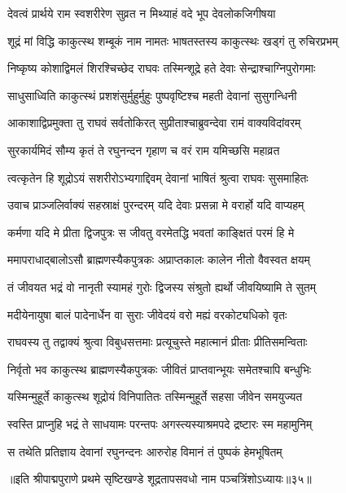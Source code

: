 \twolineshloka
{देवत्वं प्रार्थये राम स्वशरीरेण सुव्रत}
{न मिथ्याहं वदे भूप देवलोकजिगीषया}%

\twolineshloka
{शूद्रं मां विद्धि काकुत्स्थ शम्बूकं नाम नामतः}
{भाषतस्तस्य काकुत्स्थः खड्गं तु रुचिरप्रभम्}%

\twolineshloka
{निष्कृष्य कोशाद्विमलं शिरश्चिच्छेद राघवः}
{तस्मिन्शूद्रे हते देवाः सेन्द्राश्चाग्निपुरोगमाः}%

\twolineshloka
{साधुसाध्विति काकुत्स्थं प्रशशंसुर्मुहुर्मुहुः}
{पुष्पवृष्टिश्च महती देवानां सुसुगन्धिनी}%

\twolineshloka
{आकाशाद्विप्रमुक्ता तु राघवं सर्वतोकिरत्}
{सुप्रीताश्चाब्रुवन्देवा रामं वाक्यविदांवरम्}%

\twolineshloka
{सुरकार्यमिदं सौम्य कृतं ते रघुनन्दन}
{गृहाण च वरं राम यमिच्छसि महाव्रत}%

\twolineshloka
{त्वत्कृतेन हि शूद्रोऽयं सशरीरोऽभ्यगाद्दिवम्}
{देवानां भाषितं श्रुत्वा राघवः सुसमाहितः}%

\twolineshloka
{उवाच प्राञ्जलिर्वाक्यं सहस्राक्षं पुरन्दरम्}
{यदि देवाः प्रसन्ना मे वरार्हो यदि वाप्यहम्}%

\twolineshloka
{कर्मणा यदि मे प्रीता द्विजपुत्रः स जीवतु}
{वरमेतद्धि भवतां काङ्क्षितं परमं हि मे}%

\twolineshloka
{ममापराधाद्बालोऽसौ ब्राह्मणस्यैकपुत्रकः}
{अप्राप्तकालः कालेन नीतो वैवस्वत क्षयम्}%

\twolineshloka
{तं जीवयत भद्रं वो नानृती स्यामहं गुरोः}
{द्विजस्य संश्रुतो ह्यर्थो जीवयिष्यामि ते सुतम्}%

\twolineshloka
{मदीयेनायुषा बालं पादेनार्धेन वा सुराः}
{जीवेदयं वरो मह्यं वरकोट्यधिको वृतः}%

\twolineshloka
{राघवस्य तु तद्वाक्यं श्रुत्वा विबुधसत्तमाः}
{प्रत्यूचुस्ते महात्मानं प्रीताः प्रीतिसमन्विताः}%

\twolineshloka
{निर्वृतो भव काकुत्स्थ ब्राह्मणस्यैकपुत्रकः}
{जीवितं प्राप्तवान्भूयः समेतश्चापि बन्धुभिः}%

\twolineshloka
{यस्मिन्मुहूर्ते काकुत्स्थ शूद्रोयं विनिपातितः}
{तस्मिन्मुहूर्ते सहसा जीवेन समयुज्यत}%

\twolineshloka
{स्वस्ति प्राप्नुहि भद्रं ते साधयामः परन्तपः}
{अगस्त्यस्याश्रमपदे द्रष्टारः स्म महामुनिम्}%

\twolineshloka
{स तथेति प्रतिज्ञाय देवानां रघुनन्दनः}
{आरुरोह विमानं तं पुष्पकं हेमभूषितम्}%

{॥इति श्रीपाद्मपुराणे प्रथमे सृष्टिखण्डे शूद्रतापसवधो नाम पञ्चत्रिंशोऽध्यायः॥३५॥}
